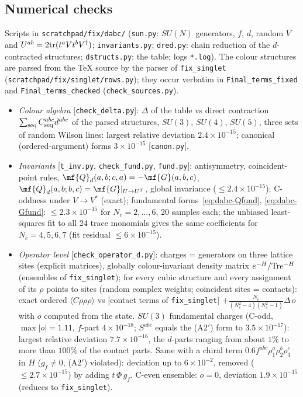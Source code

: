 \subsection{Numerical checks}\label{sec:dabc-num}
\noindent Scripts in \texttt{scratchpad/fix/dabc/} (\texttt{sun.py}: $SU(N)$ generators, $f$, $d$, random $V$ and $U^{ab}=2{\rm tr}(t^{a}Vt^{b}V^{\dagger})$; \texttt{invariants.py}; \texttt{dred.py}: chain reduction of the $d$-contracted structures; \texttt{dstructs.py}: the table; logs \texttt{*.log}). The colour structures are parsed from the TeX source by the parser of \texttt{fix\_singlet} (\texttt{scratchpad/fix/singlet/rows.py}); they occur verbatim in \texttt{Final\_terms\_fixed} and \texttt{Final\_terms\_checked} (\texttt{check\_sources.py}).
\begin{itemize}
\item \emph{Colour algebra} [\texttt{check\_delta.py}]: $\Delta$ of the table vs direct contraction $\sum_{\rm seq}C^{abc}_{\rm seq}d^{abc}$ of the parsed structures, $SU(3)$, $SU(4)$, $SU(5)$, three sets of random Wilson lines: largest relative deviation $2.4\times10^{-15}$; canonical (ordered-argument) forms $3\times10^{-15}$ [\texttt{canon.py}].
\item \emph{Invariants} [\texttt{t\_inv.py}, \texttt{check\_fund.py}, \texttt{fund.py}]: antisymmetry, coincident-point rules, $\mf{Q}_{d}(a,b;c,a)=-\mf{G}(a,b,c)$, $\mf{Q}_{d}(a,b;b,c)=\mf{G}|_{U\to U^{T}}$, global invariance ($\le2.4\times10^{-15}$); C-oddness under $V\to V^{*}$ (exact); fundamental forms~\eqref{eq:dabc-Qfund}, \eqref{eq:dabc-Gfund}: $\le2.3\times10^{-15}$ for $N_{c}=2,\dots,6$, 20 samples each; the unbiased least-squares fit to all 24 trace monomials gives the same coefficients for $N_{c}=4,5,6,7$ (fit residual $\le6\times10^{-15}$).
\item \emph{Operator level} [\texttt{check\_operator\_d.py}]: charges = generators on three lattice sites (explicit matrices), globally colour-invariant density matrix $e^{-H}/{\rm Tr}e^{-H}$ (ensembles of \texttt{fix\_singlet}); for every cubic structure and every assignment of its $\rho$ points to sites (random complex weights; coincident sites = contacts): exact ordered $\langle C\rho\rho\rho\rangle$ vs [contact terms of \texttt{fix\_singlet}] $+\frac{N_{c}}{(N_{c}^{2}-4)(N_{c}^{2}-1)}\Delta\,o$ with $o$ computed from the state. $SU(3)$ fundamental charges (C-odd, $\max|o|=1.11$, $f$-part $4\times10^{-18}$; $S^{abc}$ equals the (A2$'$) form to $3.5\times10^{-17}$): largest relative deviation $7.7\times10^{-16}$, the $d$-parts ranging from about $1\%$ to more than $100\%$ of the contact parts. Same with a chiral term $0.6f^{abc}\rho_{1}^{a}\rho_{2}^{b}\rho_{3}^{c}$ in $H$ ($g_{f}\neq0$, (A2$'$) violated): deviation up to $6\times10^{-2}$, removed ($\le2.7\times10^{-15}$) by adding $t\,\Phi\,g_{f}$. C-even ensemble: $o=0$, deviation $1.9\times10^{-15}$ (reduces to \texttt{fix\_singlet}).

\end{itemize}
